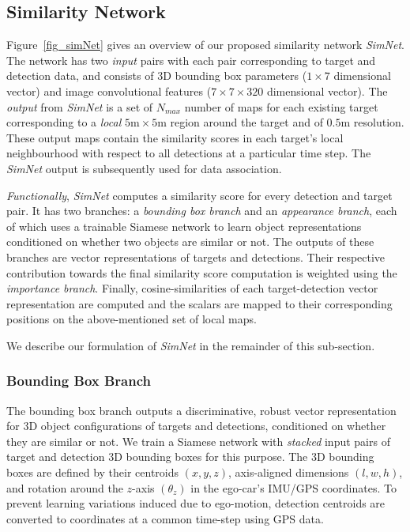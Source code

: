 \documentclass[letterpaper, 10 pt, conference]{ieeeconf}
\begin{document}
\subsection{Similarity Network}
Figure~\ref{fig_simNet} gives an overview of our proposed similarity network \textit{SimNet}. The network has two \textit{input} pairs with each pair corresponding to target and detection data, and consists of 3D bounding box parameters ($1\times7$ dimensional vector) and image convolutional features ($7 \times 7 \times 320$ dimensional vector). The \textit{output} from \textit{SimNet} is a set of $N_{max}$ number of maps for each existing target corresponding to a \textit{local} $5 \si{\m} \times 5 \si{\m}$ region around the target and of $0.5 \si{\m}$ resolution. These output maps contain the similarity scores in each target's local neighbourhood with respect to all detections at a particular time step. The \textit{SimNet} output is subsequently used for data association. 
\par \textit{Functionally}, \textit{SimNet} computes a similarity score for every detection and target pair. It has two branches: a \textit{bounding box branch} and an \textit{appearance branch}, each of which uses a trainable Siamese network to learn object representations conditioned on whether two objects are similar or not. The outputs of these branches are vector representations of targets and detections. Their respective contribution towards the final similarity score computation is weighted using the \textit{importance branch}. Finally, cosine-similarities of each target-detection vector representation are computed and the scalars are mapped to their corresponding positions on the above-mentioned set of local maps. 
\par We describe our formulation of \textit{SimNet} in the remainder of this sub-section.

\subsubsection{Bounding Box Branch}
The bounding box branch outputs a discriminative, robust vector representation for 3D object configurations of targets and detections, conditioned on whether they are similar or not. We train a Siamese network with \textit{stacked} input pairs of target and detection 3D bounding boxes for this purpose. The 3D bounding boxes are defined by their centroids $\left(x, y, z \right)$, axis-aligned dimensions $\left( l, w, h \right)$, and rotation around the $z$-axis $\left( \theta_z \right)$  in the ego-car's IMU/GPS coordinates. To prevent learning variations induced due to ego-motion, detection centroids are converted to coordinates at a common time-step using GPS data. 
\end{document}
